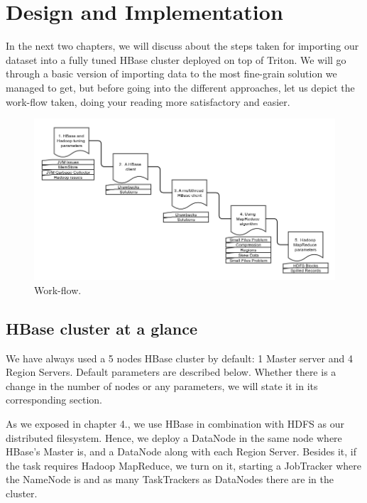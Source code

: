 \chapter{Design and Implementation}
\label{chapter:Design and Implementation}



In the next two chapters, we will discuss about the steps taken for importing our dataset into a fully tuned HBase cluster deployed on top of Triton. We will go through a basic version of importing data to the most fine-grain solution we managed to get, but before going into the different approaches, let us depict the work-flow taken, doing your reading more satisfactory and easier.


\bigskip
\begin{figure}[htb]
\centering
\includegraphics[width=1\textwidth]{./images/approaches.png}
\caption{Work-flow.} \label{fig:approaches}
\end{figure}




\section{HBase cluster at a glance}

We have always used a 5 nodes HBase cluster by default: 1 Master server and 4 Region Servers. Default parameters are described below. Whether there is a change in the number of nodes or any parameters, we will state it in its corresponding section.
\par
As we exposed in chapter 4., we use HBase in combination with HDFS as our distributed filesystem. Hence, we deploy a DataNode in the same node where HBase's Master is, and a DataNode along with each Region Server. Besides it, if the task requires Hadoop MapReduce, we turn on it, starting a JobTracker where the NameNode is and as many TaskTrackers as DataNodes there are in the cluster.


